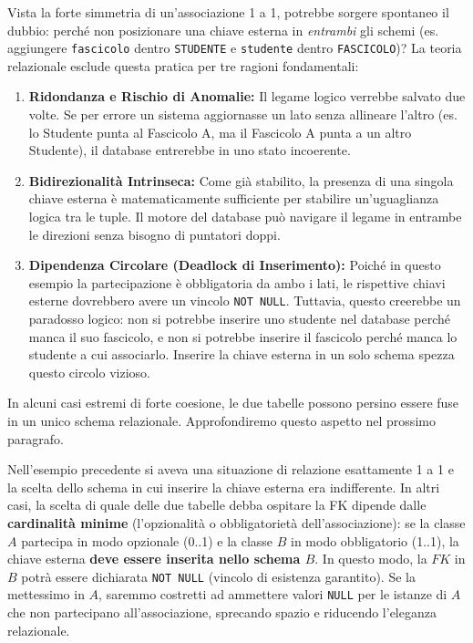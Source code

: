\begin{dettagli}
Vista la forte simmetria di un'associazione 1 a 1, potrebbe sorgere spontaneo il dubbio: perché non posizionare una chiave esterna in \textit{entrambi} gli schemi (es. aggiungere \texttt{fascicolo} dentro \texttt{STUDENTE} e \texttt{studente} dentro \texttt{FASCICOLO})? 
La teoria relazionale esclude questa pratica per tre ragioni fondamentali:
\begin{enumerate}
    \item \textbf{Ridondanza e Rischio di Anomalie:} Il legame logico verrebbe salvato due volte. Se per errore un sistema aggiornasse un lato senza allineare l'altro (es. lo Studente punta al Fascicolo A, ma il Fascicolo A punta a un altro Studente), il database entrerebbe in uno stato incoerente.
    \item \textbf{Bidirezionalità Intrinseca:} Come già stabilito, la presenza di una singola chiave esterna è matematicamente sufficiente per stabilire un'uguaglianza logica tra le tuple. Il motore del database può navigare il legame in entrambe le direzioni senza bisogno di puntatori doppi.
    \item \textbf{Dipendenza Circolare (Deadlock di Inserimento):} Poiché in questo esempio la partecipazione è obbligatoria da ambo i lati, le rispettive chiavi esterne dovrebbero avere un vincolo \texttt{NOT NULL}. Tuttavia, questo creerebbe un paradosso logico: non si potrebbe inserire uno studente nel database perché manca il suo fascicolo, e non si potrebbe inserire il fascicolo perché manca lo studente a cui associarlo. Inserire la chiave esterna in un solo schema spezza questo circolo vizioso.
\end{enumerate}
\end{dettagli}

\begin{observation}
    In alcuni casi estremi di forte coesione, le due tabelle possono persino essere fuse in un unico schema relazionale. Approfondiremo questo aspetto nel prossimo paragrafo. 
\end{observation}

Nell'esempio precedente si aveva una situazione di relazione esattamente 1 a 1 e la scelta dello schema in cui inserire la chiave esterna era indifferente. In altri casi, la scelta di quale delle due tabelle debba ospitare la FK dipende dalle \textbf{cardinalità minime} (l'opzionalità o obbligatorietà dell'associazione): se la classe $A$ partecipa in modo opzionale (0..1) e la classe $B$ in modo obbligatorio (1..1), la chiave esterna \textbf{deve essere inserita nello schema $B$}. In questo modo, la $FK$ in $B$ potrà essere dichiarata \texttt{NOT NULL} (vincolo di esistenza garantito). Se la mettessimo in $A$, saremmo costretti ad ammettere valori \texttt{NULL} per le istanze di $A$ che non partecipano all'associazione, sprecando spazio e riducendo l'eleganza relazionale.

